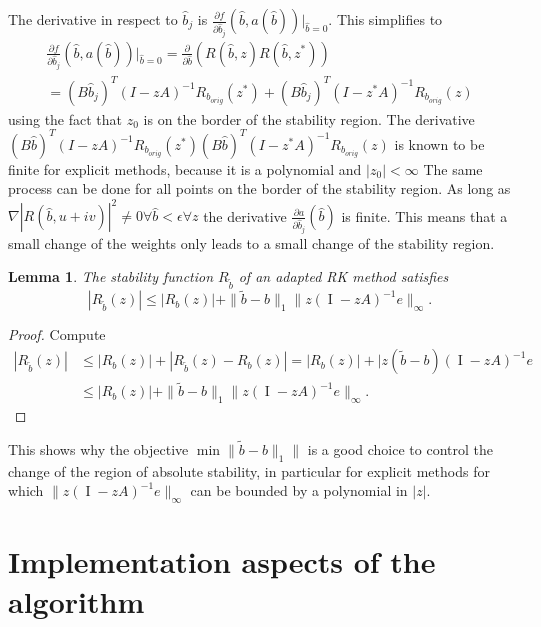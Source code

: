 \documentclass[a4paper]{article}
\numberwithin{equation}{section}
\theoremstyle{plain}
\newtheorem{lemma}[theorem]{Lemma}
\theoremstyle{definition}
\numberwithin{theorem}{section}
\newcommand{\1}{\mathbbm{1}}
\newcommand{\I}{\operatorname{I}}
\newcommand{\bt}{\tilde{b}}
\newcommand{\todo}[1]{{\Large{\color{red}{#1}}}}
\begin{document}
The derivative in respect to $\hat{b}_j$ is 
$ \frac{\partial f}{\partial \hat{b}_j}(\hat{b},a(\hat{b})) \Big|_{\hat{b}=0}$.
This simplifies to 
\begin{multline}\label{eq:derivative_to_b}
 \frac{\partial f}{\partial \hat{b}_j}(\hat{b},a(\hat{b})) \Big|_{\hat{b}=0} = 
 \frac{\partial }{\partial \hat{b}}(R(\hat{b},z)R(\hat{b},z^*)) \\
 = (B\hat{b}_j)^T (I-zA)^{-1} R_{b_{orig}}(z^*) + (B\hat{b}_j)^T (I-z^*A)^{-1} R_{b_{orig}}(z)
\end{multline}
using the fact that $z_0$ is on the border of the stability region.
The derivative $(B\hat{b})^T (I-zA)^{-1} R_{b_{orig}}(z^*) (B\hat{b})^T (I-z^*A)^{-1} R_{b_{orig}}(z)$ is known to be finite for explicit methods, because it is a polynomial and $|z_0| < \infty$
The same process can be done for all points on the border of the stability region. 
As long as $\nabla|R(\hat{b},u+iv)|^2 \neq 0 \forall \hat{b} < \epsilon  \forall z$ the derivative $\frac{\partial a}{\partial \hat{b}_j} (\hat{b})$ is finite. This means that a small change of the weights only leads to a small change of the stability region.

\todo{TODO: Some better theorem?} %
\begin{lemma}
  The stability function $R_{\bt}$ of an adapted RK method
  satisfies
  \begin{equation}
    | R_{\bt}(z) |
    \le
    | R_{b}(z) |
    + \| \bt - b \|_1 \| z (\I - z A)^{-1} e \|_\infty.
  \end{equation}
\end{lemma}
\begin{proof}
  Compute
  \begin{equation}
  \begin{aligned}
    | R_{\bt}(z) |
    &\le
    | R_{b}(z) |
    + | R_{\bt}(z) - R_{b}(z) |
    =
    | R_{b}(z) |
    + | z (\bt - b) (\I - z A)^{-1} e
    \\
    &\le
    | R_{b}(z) |
    + \| \bt - b \|_1 \| z (\I - z A)^{-1} e \|_\infty.
  \end{aligned}
  \end{equation}
\end{proof}
This shows why the objective $\min \| \bt - b \|_1 \|$ is a good
choice to control the change of the region of absolute stability,
in particular for explicit methods for which
$\| z (\I - z A)^{-1} e \|_\infty$ can be bounded by a polynomial
in $|z|$.


\section{Implementation aspects of the algorithm}\label{sec:imple}
\end{document}
